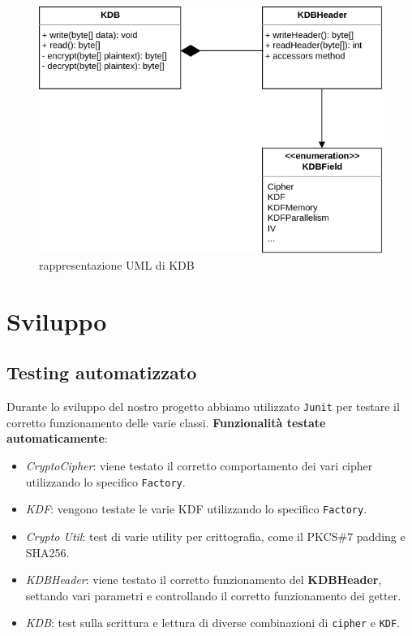 \documentclass[a4paper,12pt]{report}
\begin{document}
\begin{figure}[h]
\centering{}
\includegraphics[width=\textwidth]{kdb}
\caption{rappresentazione UML di KDB}
\end{figure}

\chapter{Sviluppo}
\section{Testing automatizzato}

Durante lo sviluppo del nostro progetto abbiamo utilizzato \texttt{Junit} per
testare il corretto funzionamento delle varie classi.
\textbf{Funzionalità testate automaticamente}:
\begin{itemize}
  \item \textit{CryptoCipher}: viene testato il corretto comportamento dei vari cipher utilizzando lo specifico \texttt{Factory}.
  \item \textit{KDF}: vengono testate le varie KDF utilizzando lo specifico \texttt{Factory}.
  \item \textit{Crypto Util}: test di varie utility per crittografia, come il PKCS\#7 padding e SHA256.
  \item \textit{KDBHeader}: viene testato il corretto funzionamento del \textbf{KDBHeader}, settando vari parametri e controllando il corretto funzionamento dei getter.
  \item \textit{KDB}: test sulla scrittura e lettura di diverse combinazioni di \texttt{cipher} e \texttt{KDF}.
\end{itemize}
\end{document}
